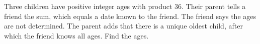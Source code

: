 Three children have positive integer ages with product 36. Their parent tells a friend the sum, which equals a date known to the friend. The friend says the ages are not determined. The parent adds that there is a unique oldest child, after which the friend knows all ages. Find the ages.
